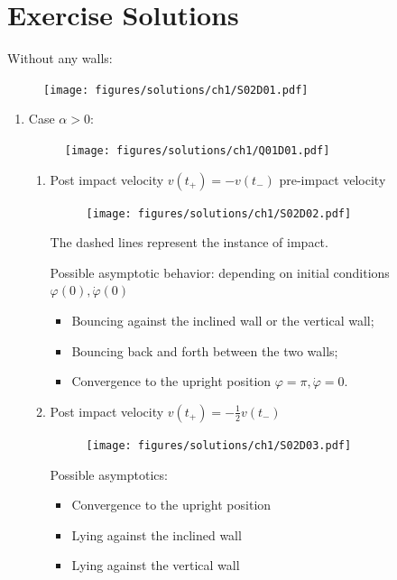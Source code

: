 \chapter{Exercise Solutions}
\begin{solution}[1.1]
Without any walls:
\begin{figure}[h]
	\centering
	\texttt{[image: figures/solutions/ch1/S02D01.pdf]}
\end{figure}

\begin{enumerate}
\item Case $\alpha > 0$:
\begin{figure}[h]
	\centering
	\texttt{[image: figures/solutions/ch1/Q01D01.pdf]}
\end{figure}

\newpage 
\begin{enumerate}
\item Post impact velocity $ v(t_+) = -v(t_-)$ pre-impact velocity

\begin{figure}[h]
	\centering
	\texttt{[image: figures/solutions/ch1/S02D02.pdf]}
\end{figure}
The dashed lines represent the instance of impact.

Possible asymptotic behavior: depending on initial conditions $\varphi(0), \dot{\varphi}(0)$ 

\begin{itemize}
	\item {Bouncing against the inclined wall or the vertical wall;}
	\item {Bouncing back and forth between the two walls;}
	\item {Convergence to the upright position $\varphi = \pi, \dot{\varphi}=0$.}
\end{itemize}


\item Post impact velocity $ v(t_+) = -\frac{1}{2}v(t_-) $
\begin{figure}[h]
	\centering
	\texttt{[image: figures/solutions/ch1/S02D03.pdf]}
\end{figure}
Possible asymptotics:
\begin{itemize}
	\item Convergence to the upright position
	\item Lying against the inclined wall
	\item Lying against the vertical wall
\end{itemize}


\end{enumerate}
\end{enumerate}
\end{solution}
